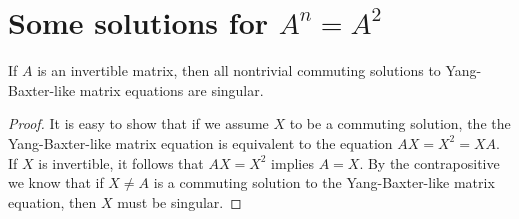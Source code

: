 \documentclass{article}
\begin{document}
\section{Some solutions for $A^n = A^2$}
\begin{theorem} \label{singular}
  If $A$ is an invertible matrix, then all nontrivial commuting solutions to Yang-Baxter-like matrix equations are singular.
\end{theorem}

\begin{proof}
  It is easy to show that if we assume $X$ to be a commuting solution, the the Yang-Baxter-like matrix equation is equivalent to the equation $AX = X^2 = XA$.
  If $X$ is invertible, it follows that $AX = X^2$ implies $A = X$.
  By the contrapositive we know that if $X \neq A$ is a commuting solution to the Yang-Baxter-like matrix equation, then $X$ must be singular.
\end{proof}
\end{document}
